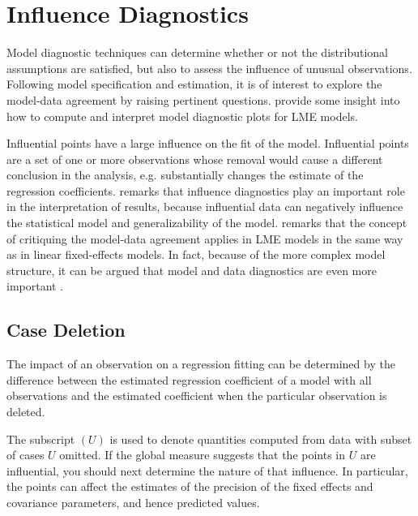 \documentclass[12pt, a4paper]{report}
\theoremstyle{definition}
\theoremstyle{remark}
\begin{document}
\section{Influence Diagnostics}
Model diagnostic techniques can determine whether or not the distributional assumptions are satisfied, but also to assess the influence of unusual observations. Following model specification and estimation, it is of interest to explore the model-data agreement by raising pertinent questions. \citet{PB} provide some insight into how to compute and interpret model diagnostic plots for LME models. 

	
	Influential points have a large influence on the fit of the model. Influential points are a set of one or more observations whose removal would cause a different conclusion in the analysis, e.g. substantially changes the estimate of the regression coefficients. \citet{west} remarks that influence diagnostics play an important role in the interpretation of results, because influential data can negatively influence the statistical model and generalizability of the model. \citet{schabenberger} remarks that the concept of critiquing the model-data agreement applies in LME models in the same way as in linear
	fixed-effects models. In fact, because of the more complex model structure, it can be argued that model and
	data diagnostics are even more important \citep{west}.
	
	
	
	


\subsection*{Case Deletion}

The impact of an observation on a regression fitting can be determined by the difference between the estimated regression coefficient of a model with all observations and the estimated coefficient when the particular observation is deleted. 

The subscript $(U)$ is used to denote quantities computed from data with subset of cases $U$ omitted.
If the global measure suggests that the points in $U$ are influential, you should next determine the nature of
that influence. In particular, the points can affect the estimates of the precision of the fixed effects and covariance parameters, and hence predicted values.
\end{document}
